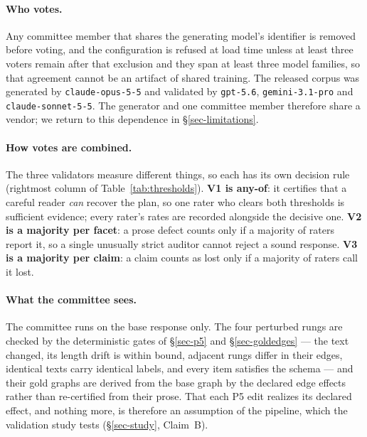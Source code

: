 \paragraph{Who votes.} Any committee member that shares the generating model's identifier is removed before
voting, and the configuration is refused at load time unless at least three voters remain after that exclusion and
they span at least three model families, so that agreement cannot be an artifact of shared training. The released
corpus was generated by \texttt{claude-opus-5-5} and validated by \texttt{gpt-5.6}, \texttt{gemini-3.1-pro} and
\texttt{claude-sonnet-5-5}. The generator and one committee member therefore share a vendor; we return to this
dependence in \S\ref{sec-limitations}.

\paragraph{How votes are combined.} The three validators measure different things, so each has its own decision
rule (rightmost column of Table~\ref{tab:thresholds}). \textbf{V1 is any-of}: it certifies that a careful reader
\emph{can} recover the plan, so one rater who clears both thresholds is sufficient evidence; every rater's rates are
recorded alongside the decisive one. \textbf{V2 is a majority per facet}: a prose defect counts only if a majority
of raters report it, so a single unusually strict auditor cannot reject a sound response. \textbf{V3 is a majority
per claim}: a claim counts as lost only if a majority of raters call it lost.

\paragraph{What the committee sees.} The committee runs on the base response only. The four perturbed rungs are
checked by the deterministic gates of \S\ref{sec-p5} and \S\ref{sec-goldedges} --- the text changed, its length
drift is within bound, adjacent rungs differ in their edges, identical texts carry identical labels, and every item
satisfies the schema --- and their gold graphs are derived from the base graph by the declared edge effects rather
than re-certified from their prose. That each P5 edit realizes its declared effect, and nothing more, is therefore
an assumption of the pipeline, which the validation study tests (\S\ref{sec-study}, Claim~B).


